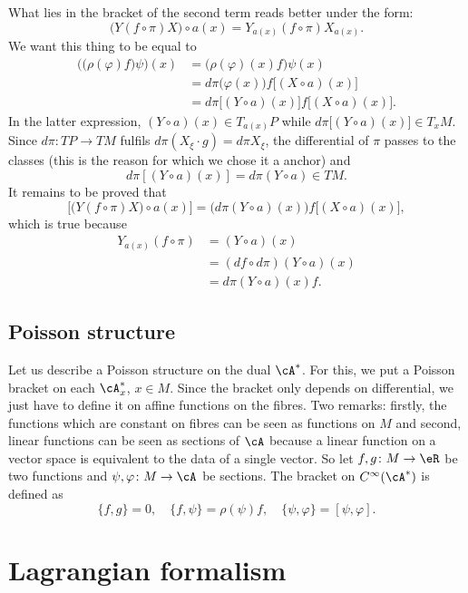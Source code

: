 What lies in the bracket of the second term reads better under the form:
\[ 
  \big( Y(f\circ\pi)X \big)\circ a(x)=Y_{a(x)}(f\circ\pi)X_{a(x)}.
\]
We want this thing to be equal to
\begin{align*}
\Big( \big( \rho(\varphi)f \big)\psi \Big)(x)&=\big( \rho(\varphi)(x)f \big)\psi(x)\\
		&=d\pi\big( \varphi(x) \big)f\big[ (X\circ a)(x) \big]\\
		&=d\pi\big[ (Y\circ a)(x) \big]f\big[ (X\circ a)(x) \big].
\end{align*}
In the latter expression, $(Y\circ a)(x)\in T_{a(x)}P$ while  $d\pi\big[ (Y\circ a)(x)\Big]\in T_{x}M$. Since $d\pi\colon TP\to TM$ fulfils $d\pi(X_{\xi}\cdot g)=d\pi X_{\xi}$, the differential of $\pi$ passes to the classes (this is the reason for which we chose it a anchor) and
\[ 
  d\pi[(Y\circ a)(x)]=d\pi(Y\circ a)\in TM.
\]
It remains to be proved that 
\[ 
  \Big[ \big( Y(f\circ\pi)X \big)\circ a(x) \Big]=\big( d\pi(Y\circ a)(x) \big)f\big[ (X\circ a)(x) \big],
\]
which is true because
\begin{align*}
Y_{a(x)}(f\circ\pi)&=(Y\circ a)(x)\\
		&=(df\circ d\pi)(Y\circ a)(x)\\
		&=d\pi(Y\circ a)(x)f.
\end{align*}

\subsection{Poisson structure}

Let us describe a Poisson structure on the dual $\cA^*$. For this, we put a Poisson bracket on each $\cA^*_{x}$, $x\in M$. Since the bracket only depends on differential, we just have to define it on affine functions on the fibres. Two remarks: firstly, the functions which are constant on fibres can be seen as functions on $M$ and second, linear functions can be seen as sections of $\cA$ because a linear function on a vector space is equivalent to the data of a single vector. So let $f,g\colon M\to \eR$ be two functions and $\psi,\varphi\colon M\to \cA$ be sections. The bracket on $ C^{\infty}(\cA^*)$ is defined as
\begin{equation}
\{ f,g \}=0,\quad \{ f,\psi \}=\rho(\psi)f,\quad\{ \psi,\varphi \}=[\psi,\varphi].
\end{equation}

\section{Lagrangian formalism}

